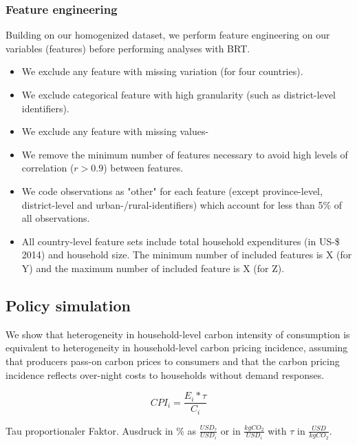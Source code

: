 \documentclass[12pt, a4paper]{article}
\begin{document}
\subsubsection{Feature engineering} \label{sec:featureengineering}

Building on our homogenized dataset, we perform feature engineering on our variables (features) before performing analyses with BRT.

\begin{itemize}
    \item We exclude any feature with missing variation (for four countries).
    \item We exclude categorical feature with high granularity (such as district-level identifiers).
    \item We exclude any feature with missing values-
    \item We remove the minimum number of features necessary to avoid high levels of correlation ($r>0.9$) between features.
    \item We code observations as "other" for each feature (except province-level, district-level and urban-/rural-identifiers) which account for less than 5\% of all observations.
    \item All country-level feature sets include total household expenditures (in US-\$ 2014) and household size. The minimum number of included features is X (for Y) and the maximum number of included feature is X (for Z).
\end{itemize}

\subsection{Policy simulation}\label{sec:policysimulation}

We show that heterogeneity in household-level carbon intensity of consumption is equivalent to heterogeneity in household-level carbon pricing incidence, assuming that producers pass-on carbon prices to consumers and that the carbon pricing incidence reflects over-night costs to households without demand responses.

\begin{equation}
    CPI_{i} = \frac{E_{i}*\tau}{C_{i}}
\end{equation}

Tau proportionaler Faktor. Ausdruck in \% as $\frac{USD_{\tau}}{USD_{i}}$ or in $\frac{kgCO_{2}}{USD_{i}}$ with $\tau$ in $\frac{USD}{kgCO_{2}}$.

\clearpage
\end{document}
